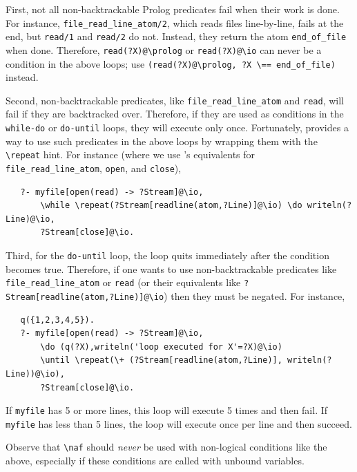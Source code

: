 \documentclass[11pt]{article}
\newcommand{\ERGO}{\mbox{\smaller{\ensuremath{\cal{E}}\smaller{{\sc{RGO}}}}}\xspace}
\newcommand{\FLSYSTEM}{\ERGO}
\newcommand{\bs}{\textbackslash}
\newcommand{\RULELOGNAF}{{\texttt{{\bs}naf}}\xspace}
\begin{document}
First, not all non-backtrackable
Prolog predicates fail when their work is done. For
instance, \texttt{file\_read\_line\_atom/2}, which reads files line-by-line,
fails at the end, but \texttt{read/1} and \texttt{read/2} do not. Instead,
they return the atom \texttt{end\_of\_file} when done. Therefore,
\texttt{read(?X)@\bs{}prolog} or
\texttt{read(?X)@\bs{}io} can never be a condition in the above loops; use
\texttt{(read(?X)@\bs{}prolog, ?X \bs{}== end\_of\_file)} instead.

\index{\bs{}repeat option in do-loops}
Second, non-backtrackable predicates, like
\texttt{file\_read\_line\_atom} and \texttt{read}, 
will fail if they are 
backtracked over. Therefore, if they are used as conditions in
the \texttt{while-do} or \texttt{do-until} loops, they will execute only
once.
Fortunately, \FLSYSTEM provides a way to use such predicates in the above
loops by wrapping them with the \texttt{\bs{}repeat} hint. For instance
(where we use \FLSYSTEM's equivalents for \texttt{file\_read\_line\_atom},
\texttt{open}, and \texttt{close}),
\begin{verbatim}
   ?- myfile[open(read) -> ?Stream]@\io,
       \while \repeat(?Stream[readline(atom,?Line)]@\io) \do writeln(?Line)@\io,
       ?Stream[close]@\io.
\end{verbatim}

Third, for the \texttt{do-until} loop, the loop quits immediately after the
condition becomes true. Therefore, if one wants to use
non-backtrackable predicates like
\texttt{file\_read\_line\_atom} or \texttt{read} (or their \FLSYSTEM
equivalents like
\texttt{?Stream[readline(atom,?Line)]@\bs{}io}) then they must be negated.
For instance,
\begin{verbatim}
   q({1,2,3,4,5}).
   ?- myfile[open(read) -> ?Stream]@\io,
       \do (q(?X),writeln('loop executed for X'=?X)@\io)
       \until \repeat(\+ (?Stream[readline(atom,?Line)], writeln(?Line))@\io),
       ?Stream[close]@\io.
\end{verbatim}
If \texttt{myfile} has 5 or more lines, this loop will execute 5 times and
then fail. If \texttt{myfile} has less than 5 lines, the loop will execute
once per line and then succeed.

Observe that \RULELOGNAF should \emph{never} be used with non-logical
conditions like the above, especially if these conditions are called with
unbound variables.
\end{document}
